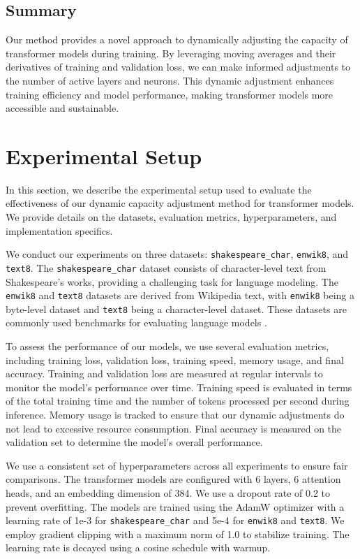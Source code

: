 \documentclass{article} %
\begin{document}
\subsection{Summary}
Our method provides a novel approach to dynamically adjusting the capacity of transformer models during training. By leveraging moving averages and their derivatives of training and validation loss, we can make informed adjustments to the number of active layers and neurons. This dynamic adjustment enhances training efficiency and model performance, making transformer models more accessible and sustainable.

\section{Experimental Setup}
\label{sec:experimental}

In this section, we describe the experimental setup used to evaluate the effectiveness of our dynamic capacity adjustment method for transformer models. We provide details on the datasets, evaluation metrics, hyperparameters, and implementation specifics.

We conduct our experiments on three datasets: \texttt{shakespeare\_char}, \texttt{enwik8}, and \texttt{text8}. The \texttt{shakespeare\_char} dataset consists of character-level text from Shakespeare's works, providing a challenging task for language modeling. The \texttt{enwik8} and \texttt{text8} datasets are derived from Wikipedia text, with \texttt{enwik8} being a byte-level dataset and \texttt{text8} being a character-level dataset. These datasets are commonly used benchmarks for evaluating language models \citep{karpathy2023nanogpt}.

To assess the performance of our models, we use several evaluation metrics, including training loss, validation loss, training speed, memory usage, and final accuracy. Training and validation loss are measured at regular intervals to monitor the model's performance over time. Training speed is evaluated in terms of the total training time and the number of tokens processed per second during inference. Memory usage is tracked to ensure that our dynamic adjustments do not lead to excessive resource consumption. Final accuracy is measured on the validation set to determine the model's overall performance.

We use a consistent set of hyperparameters across all experiments to ensure fair comparisons. The transformer models are configured with 6 layers, 6 attention heads, and an embedding dimension of 384. We use a dropout rate of 0.2 to prevent overfitting. The models are trained using the AdamW optimizer \citep{loshchilov2017adamw} with a learning rate of 1e-3 for \texttt{shakespeare\_char} and 5e-4 for \texttt{enwik8} and \texttt{text8}. We employ gradient clipping with a maximum norm of 1.0 to stabilize training. The learning rate is decayed using a cosine schedule with warmup.
\end{document}
